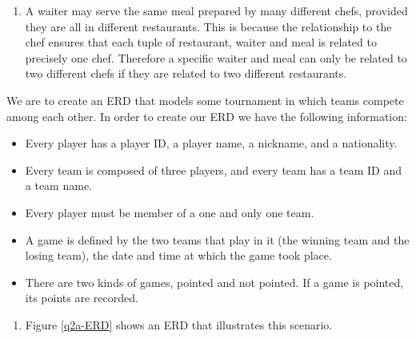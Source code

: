 \documentclass[fleqn]{article}
\begin{document}
\begin{answers}
\begin{enumerate}
\begin{enumerate}
					\item %
						A waiter may serve the same meal prepared by many different chefs, provided they are all in different restaurants. This is because the relationship to the chef ensures that each tuple of restaurant, waiter and meal is related to precisely one chef. Therefore a specific waiter and meal can only be related to two different chefs if they are related to two different restaurants.
				\end{enumerate}
		\end{enumerate}

	\item %
		We are to create an ERD that models some tournament in which teams compete among each other. In order to create our ERD we have the following information:
		\begin{itemize}
			\item
				Every player has a player ID, a player name, a nickname, and a nationality.

			\item
				Every team is composed of three players, and every team has a team ID and a team name.

			\item
				Every player must be member of a one and only one team.

			\item
				A game is defined by the two teams that play in it (the winning team and the losing team), the date and time at which the game took place.

			\item
				There are two kinds of games, pointed and not pointed. If a game is pointed, its points are recorded.
		\end{itemize}

		\begin{enumerate}
			\item %
				Figure \ref{q2a-ERD} shows an ERD that illustrates this scenario.

				\begin{figure}[p]
					\centering
\end{figure}
\end{enumerate}
\end{answers}
\end{document}

